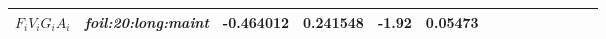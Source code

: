 \begin{table}
\begin{tabular}{ l >{\itshape}l S S S S[round-precision=3,round-minimum=0.001,table-format=>1.3] c c >{\scshape}l c S c S[round-precision=3,round-minimum=0.001,table-format=>1.3] c@{} }
	$F_i V_i G_i A_i$ & foil:20:long:maint    & -0.464012               & 0.241548               &  -1.92                       &  0.05473                &         & &                                                &                     &                                       &                                 &                                       &                      \\ \bottomrule
\end{tabular}
\end{table}
\cleardoublepage \eject \pdfpagewidth=8.5in \pdfpageheight=11in \restoregeometry \doublespacing
